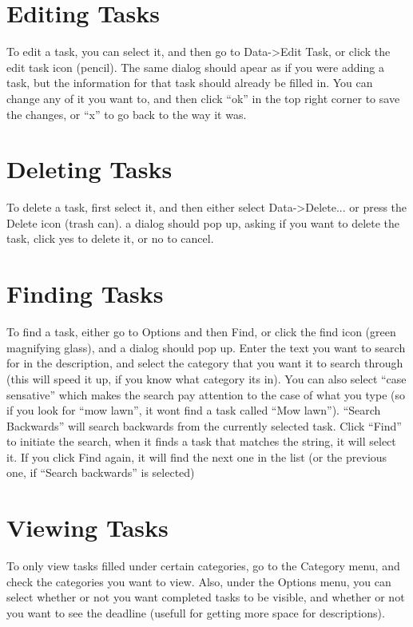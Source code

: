 \documentclass[12pt,letterpaper,oneside, openany]{book} \usepackage[latin1] {inputenc}
\begin{document}
\section{Editing Tasks}

To edit a task, you can select it, and then go to Data->Edit Task, or click the edit task icon (pencil). The same dialog should apear as if you were adding a task, but the information for that task should already be filled in. You can change any of it you want to, and then click ``ok'' in the top right corner to save the changes, or ``x'' to go back to the way it was. 

\section{Deleting Tasks}

To delete a task, first select it, and then either select Data->Delete... or press the Delete icon (trash can). a dialog should pop up, asking if you want to delete the task, click yes to delete it, or no to cancel. 

\section{Finding Tasks}

To find a task, either go to Options and then Find, or click the find icon (green magnifying glass), and a dialog should pop up. Enter the text you want to search for in the description, and select the category that you want it to search through (this will speed it up, if you know what category its in). You can also select ``case sensative'' which makes the search pay attention to the case of what you type (so if you look for ``mow lawn'', it wont find a task called ``Mow lawn''). ``Search Backwards'' will search backwards from the currently selected task. Click ``Find'' to initiate the search, when it finds a task that matches the string, it will select it. If you click Find again, it will find the next one in the list (or the previous one, if ``Search backwards'' is selected) 

\section{Viewing Tasks}

To only view tasks filled under certain categories, go to the Category menu, and check the categories you want to view. Also, under the Options menu, you can select whether or not you want completed tasks to be visible, and whether or not you want to see the deadline (usefull for getting more space for descriptions). 
\end{document}
